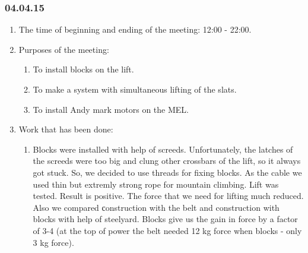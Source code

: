 \subsubsection{04.04.15}
\begin{enumerate}
	
	\item The time of beginning and ending of the meeting: 12:00 - 22:00.
	
	\item Purposes of the meeting: 
	\begin{enumerate}
		
		\item To install blocks on the lift.
		
		\item To make a system with simultaneous lifting of the slats.
		
        \item To install Andy mark motors on the MEL.
		
	\end{enumerate}

	\item Work that has been done:
	\begin{enumerate}
		
		\item Blocks were installed with help of screeds. Unfortunately, the latches of the screeds were too big and clung other crossbars of the lift, so it always got stuck. So, we decided to use threads for fixing blocks. As the cable we used thin but extremly strong rope for mountain climbing. Lift was tested. Result is positive. The force that we need for lifting much reduced. Also we compared сonstruction with the belt and construction with blocks with help of steelyard. Blocks give us the gain in force by a factor of 3-4 (at the top of power the belt needed 12 kg force when blocks - only 3 kg force). 
		\begin{figure}[H]
			\begin{minipage}[h]{0.2\linewidth}
				\center  
			\end{minipage}
			\begin{minipage}[h]{0.6\linewidth}
				\caption{}
			\end{minipage}
		\end{figure} 
		

\end{enumerate}
\end{enumerate}
